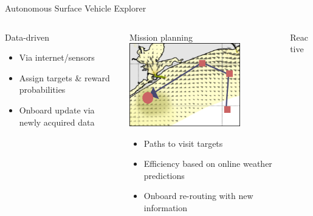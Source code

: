 \documentclass[9pt,xcolor=table]{beamer}
\begin{document}
\begin{frame}{Autonomous Surface Vehicle Explorer}
\begin{columns}
\begin{column}{0.33\textwidth}
\begin{block}{Data-driven}
            \end{block}
            \begin{itemize}
                \item Via internet/sensors
                \item Assign targets \& reward probabilities
                \item Onboard update via newly acquired data
            \end{itemize}
        \end{column}
        \begin{column}{0.33\textwidth}
            \begin{block}{Mission planning}
            \vspace{.25cm}
                \includegraphics[width=0.75\textwidth,trim={0cm 0cm 0cm 0cm},clip]{img/mission_planning.png}
            \end{block}
            \begin{itemize}
                \item Paths to visit targets
                \item Efficiency based on online weather predictions
                \item Onboard re-routing with new information
            \end{itemize}
        \end{column}
        \begin{column}{0.33\textwidth}
            \begin{block}{Reactive}
            \vspace{.25cm}

\end{block}
\end{column}
\end{columns}
\end{frame}
\end{document}
